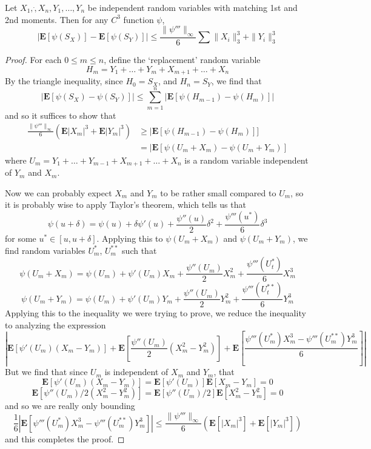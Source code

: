 \begin{theorem}
    Let $X_1, \dot, X_n, Y_1, \dots, Y_n$ be independent random variables with matching 1st and 2nd moments. Then for any $C^3$ function $\psi$,
    \[ \left| \mathbf{E}[\psi(S_X)] - \mathbf{E}[\psi(S_Y)] \right| \leq \frac{\| \psi''' \|_\infty}{6} \sum \| X_i \|_3^3 + \| Y_i \|_3^3 \]
\end{theorem}
\begin{proof}
    For each $0 \leq m \leq n$, define the `replacement' random variable
    \[ H_m = Y_1 + \dots + Y_m + X_{m+1} + \dots + X_n \]
    By the triangle inequality, since $H_0 = S_X$, and $H_n = S_Y$, we find that
    \[ \left| \mathbf{E}[\psi(S_X) - \psi(S_Y)] \right| \leq \sum_{m = 1}^n |\mathbf{E}[\psi(H_{m-1}) - \psi(H_m)]| \]
    and so it suffices to show that
    \begin{align*}
        \frac{\| \psi''' \|_\infty}{6} (\mathbf{E} |X_m|^3 + \mathbf{E} |Y_m|^3 ) &\geq |\mathbf{E}[\psi(H_{m-1}) - \psi(H_m)]]\\
        &= |\mathbf{E}[\psi(U_m + X_m) - \psi(U_m + Y_m)]
    \end{align*}
    where $U_m = Y_1 + \dots + Y_{m-1} + X_{m+1} + \dots + X_n$ is a random variable independent of $Y_m$ and $X_m$.

    Now we can probably expect $X_m$ and $Y_m$ to be rather small compared to $U_m$, so it is probably wise to apply Taylor's theorem, which tells us that
    \[ \psi(u + \delta) = \psi(u) + \delta \psi'(u) + \frac{\psi''(u)}{2} \delta^2 + \frac{\psi'''(u^*)}{6} \delta^3 \]
    for some $u^* \in [u,u + \delta]$. Applying this to $\psi(U_m + X_m)$ and $\psi(U_m + Y_m)$, we find random variables $U_m^*$, $U_m^{**}$ such that
    \[ \psi(U_m + X_m) = \psi(U_m) + \psi'(U_m) X_m + \frac{\psi''(U_m)}{2} X_m^2 + \frac{\psi'''(U_t^*)}{6} X_m^3 \]
    \[ \psi(U_m + Y_m) = \psi(U_m) + \psi'(U_m) Y_m + \frac{\psi''(U_m)}{2} Y_m^2 + \frac{\psi'''(U_t^{**})}{6} Y_m^3 \]
    Applying this to the inequality we were trying to prove, we reduce the inequality to analyzing the expression
    \[ \left| \mathbf{E}[\psi'(U_m) (X_m - Y_m)] + \mathbf{E} \left[ \frac{\psi''(U_m)}{2} (X_m^2 - Y_m^2) \right] + \mathbf{E} \left[ \frac{\psi'''(U_m^*) X_m^3 - \psi'''(U_m^{**}) Y_m^3}{6} \right] \right| \]
    But we find that since $U_m$ is independent of $X_m$ and $Y_m$, that
    \[ \mathbf{E}[\psi'(U_m) (X_m - Y_m)] = \mathbf{E}[\psi'(U_m)] \mathbf{E}[X_m - Y_m] = 0 \]
    \[ \mathbf{E}[\psi''(U_m)/2 (X_m^2 - Y_m^2)] = \mathbf{E}[\psi''(U_m)/2] \mathbf{E}[X_m^2 - Y_m^2] = 0 \]
    and so we are really only bounding
    \[ \frac{1}{6} \left| \mathbf{E} \left[ \psi'''(U_m^*) X_m^3 - \psi'''(U_m^{**}) Y_m^3 \right] \right| \leq \frac{\| \psi''' \|_\infty}{6} \left( \mathbf{E}[|X_m|^3] + \mathbf{E}[|Y_m|^3] \right) \]
    and this completes the proof.
\end{proof}

